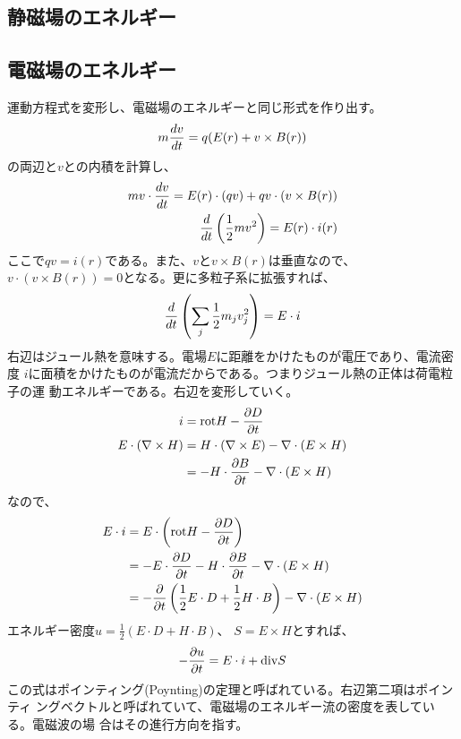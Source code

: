         \subsection{静磁場のエネルギー}
        \subsection{電磁場のエネルギー}
        運動方程式を変形し、電磁場のエネルギーと同じ形式を作り出す。
            \[m\di[v]{t} = q(E(r) + v\times B(r))\]
        の両辺と$v$との内積を計算し、
        \begin{align*}
            mv\cdot \di[v]{t}
            = E(r)\cdot (qv) + qv\cdot (v\times B(r))\\
            \di{t}\lr{\rec{2}mv^2}
            = E(r)\cdot i(r)
        \end{align*}
        ここで$qv=i(r)$である。また、$v$と$v\times B(r)$は垂直なので、
        $v\cdot (v\times B(r)) = 0$となる。更に多粒子系に拡張すれば、
            \[\di{t}\lr{\sum_j \rec{2}m_jv_j^2} = E\cdot i\]
        右辺はジュール熱を意味する。電場$E$に距離をかけたものが電圧であり、電流密度
        $i$に面積をかけたものが電流だからである。つまりジュール熱の正体は荷電粒子の運
        動エネルギーである。右辺を変形していく。
        \begin{align*}
            i &= \na{rot}H-\pd[D]{t}\\
            E\cdot (\nabla\times H) 
            &= H\cdot (\nabla\times E)-\nabla\cdot (E\times H)\\
            &= -H\cdot\pd[B]{t}-\nabla\cdot (E\times H)
        \end{align*}
        なので、
        \begin{align*}
            E\cdot i &= E\cdot \lr{\na{rot}H-\pd[D]{t}}\\
            &= -E\cdot\pd[D]{t}-H\cdot\pd[B]{t}-\nabla\cdot (E\times H)\\
            &= -\pd{t}\lr{\rec{2}E\cdot D+\rec{2}H\cdot B}
                -\nabla\cdot (E\times H)\\
        \end{align*}
        エネルギー密度$u = \frac{1}{2}(E\cdot D+H\cdot B)$、
        $S = E\times H$とすれば、
            \[-\pd[u]{t} = E\cdot i+\na{div}S\]
        この式はポインティング(Poynting)の定理と呼ばれている。右辺第二項はポインティ
        ングベクトルと呼ばれていて、電磁場のエネルギー流の密度を表している。電磁波の場
        合はその進行方向を指す。
